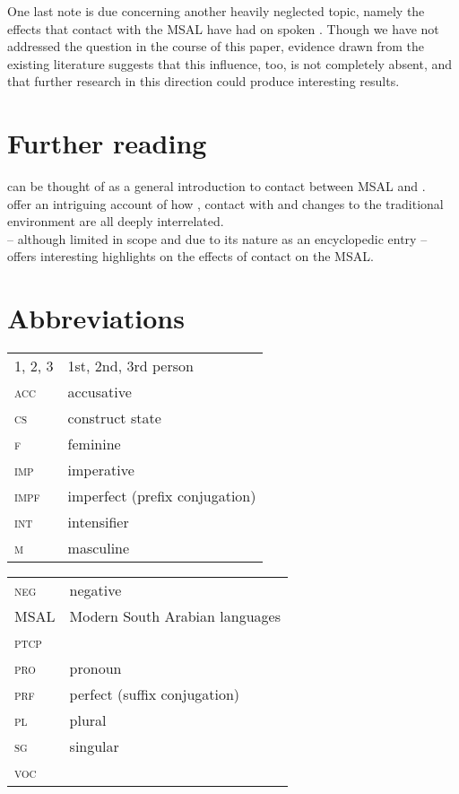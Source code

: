 \documentclass[output=paper]{langsci/langscibook}
\begin{document}
One last note is due concerning another heavily neglected topic, namely the effects that contact with the MSAL have had on spoken . Though we have not addressed the question in the course of this paper, evidence drawn from the existing literature \citep{Simeone-Senelle2002} suggests that this influence, too, is not completely absent, and that further research in this direction could produce interesting results. 

\section*{Further reading}

 \citet{Morris2017} can be thought of as a general introduction to contact between MSAL and . \\
 \citet{WatsonAl-Mahri2017} offer an intriguing account of how , contact with  and changes to the traditional environment are all deeply interrelated. \\ \citet{Lonnet2011} – although limited in scope and  due to its nature as an encyclopedic entry – offers interesting highlights on the effects of contact on the MSAL.

\section*{Abbreviations}

\begin{tabularx}{.45\textwidth}{@{}lQ@{}}
\textsc{1, 2, 3} & 1st, 2nd, 3rd person \\
\textsc{acc} & accusative \\
\textsc{cs} & construct state \\
\textsc{f} & feminine \\
\textsc{imp} & imperative \\
\textsc{impf} & imperfect (prefix conjugation) \\
\textsc{int} & intensifier \\
\textsc{m} & masculine \\
\end{tabularx}%
\begin{tabularx}{.5\textwidth}{@{}lQ@{}}
\textsc{neg} & negative \\
MSAL & {Modern South Arabian} languages \\
\textsc{ptcp} &  \\
\textsc{pro} & pronoun \\
\textsc{prf} & perfect (suffix conjugation) \\
\textsc{pl} & plural \\
\textsc{sg} & singular \\
\textsc{voc} &  \\
\end{tabularx}%



\sloppy
\printbibliography[heading=subbibliography,notkeyword=this]
\end{document}
